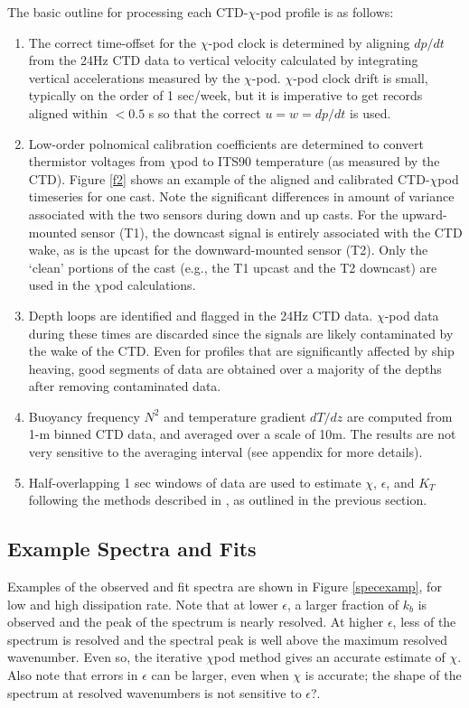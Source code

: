 \documentclass{ametsoc}
\begin{document}
The basic outline for processing each CTD-$\chi$-pod profile is as follows:
\begin{enumerate}
\item The correct time-offset for the $\chi$-pod clock is determined by aligning $dp/dt$ from the 24Hz CTD data to vertical velocity calculated by integrating vertical accelerations measured by the $\chi$-pod. $\chi$-pod clock drift is small, typically on the order of 1 sec/week, but it is imperative to get records aligned within $< 0.5$ s so that the correct $u = w = d p/dt$ is used.
\item Low-order polnomical calibration coefficients are determined to convert thermistor voltages from $\chi$pod to ITS90 temperature (as measured by
the CTD). Figure \ref{f2} shows an example of the aligned and calibrated CTD-$\chi$pod timeseries for one cast. Note the significant differences in amount of variance associated with the two sensors during down and up casts. For the upward-mounted sensor (T1), the downcast signal is entirely associated with the CTD wake, as is the upcast for the downward-mounted sensor (T2). Only the `clean' portions of the cast (e.g., the T1 upcast and the T2 downcast) are used in the $\chi$pod calculations.
\item Depth loops are identified and flagged in the 24Hz CTD data. $\chi$-pod data during these times are discarded since the signals are likely contaminated by the wake of the CTD. Even for profiles that are significantly affected by ship heaving, good segments of data are obtained over a majority of the depths after removing contaminated data. 
\item Buoyancy frequency $N^2$ and temperature gradient $dT/dz$ are computed from 1-m binned CTD data, and averaged over a scale of 10m. The results are not very sensitive to the averaging interval (see appendix for more details).
\item Half-overlapping 1 sec windows of data are used to estimate $\chi$, $\epsilon$, and $K_T$ following the methods described in \cite{moumnash09}, as outlined in the previous section.
\end{enumerate}


\subsection{Example Spectra and Fits}

Examples of the observed and fit spectra are shown in Figure \ref{specexamp}, for low and high dissipation rate. Note that at lower $\epsilon$, a larger fraction of $k_b$ is observed and the peak of the spectrum is nearly resolved. At higher $\epsilon$, less of the spectrum is resolved and the spectral peak is well above the maximum resolved wavenumber. Even so, the iterative $\chi$pod method gives an accurate estimate of $\chi$. Also note that errors in $\epsilon$ can be larger, even when $\chi$ is accurate; the shape of the spectrum at resolved wavenumbers is not sensitive to $\epsilon$?. 
\end{document}

